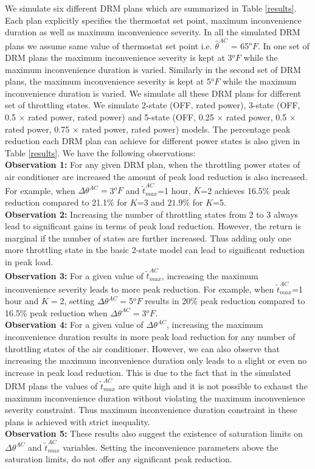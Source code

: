 \documentclass[10pt,twocolumn,twoside]{IEEEtran}
\begin{document}
We simulate six different DRM plans which are summarized in Table \ref{results}. Each plan explicitly specifies the thermostat set point, maximum inconvenience duration as well as maximum inconvenience severity. In all the simulated DRM plans we assume same value of thermostat set point i.e. $\hat{\theta}^{AC}$ = 65$^oF$. In one set of DRM plans the maximum inconvenience severity is kept at 3$^oF$ while the maximum inconvenience duration is varied. Similarly in the second set of DRM plans, the maximum inconvenience severity is kept at 5$^oF$ while the maximum inconvenience duration is varied. We simulate all these DRM plans for different set of throttling states. We simulate 2-state (OFF, rated power), 3-state (OFF, 0.5 $\times$ rated power, rated power) and 5-state (OFF, 0.25 $\times$ rated power, 0.5 $\times$ rated power, 0.75 $\times$ rated power, rated power) models. The percentage peak reduction each DRM plan can achieve for different power states is also given in Table \ref{results}. We have the following observations:\\
\textbf{Observation 1:} For any given DRM plan, when the throttling power states of air conditioner are increased the amount of peak load reduction is also increased. For example, when $\Delta{\theta}^{AC}=$3$^oF$ and $\tilde{t}^{AC}_{max}$=1 hour, $K$=2 achieves 16.5\% peak reduction compared to 21.1\% for $K$=3 and $21.9\%$ for $K$=5. \\
\textbf{Observation 2:} Increasing the number of throttling states from 2 to 3 always lead to significant gains in terms of peak load reduction. However, the return is marginal if the number of states are further increased. Thus adding only one more throttling state in the basic 2-state model can lead to significant reduction in peak load. \\
\textbf{Observation 3:} For a given value of $\tilde{t}^{AC}_{max}$, increasing the maximum inconvenience severity leads to more peak reduction. For example, when $\tilde{t}^{AC}_{max}$=1 hour and $K=2$, setting $\Delta{\theta}^{AC}=$5$^oF$ results in 20\% peak reduction compared to 16.5\% peak reduction when $\Delta{\theta}^{AC}=$3$^oF$. \\
\textbf{Observation 4:} For a given value of $\Delta{\theta}^{AC}$, increasing the maximum inconvenience duration results in more peak load reduction for any number of throttling states of the air conditioner. However, we can also observe that increasing the maximum inconvenience duration only leads to a slight or even no increase in peak load reduction. This is due to the fact that in the simulated DRM plans the values of $\tilde{t}^{AC}_{max}$ are quite high and it is not possible to exhaust the maximum inconvenience duration without violating the maximum inconvenience severity constraint. Thus maximum inconvenience duration constraint in these plans is achieved with strict inequality. \\
\textbf{Observation 5:} These results also suggest the existence of saturation limits on $\Delta{\theta}^{AC}$ and $\tilde{t}^{AC}_{max}$ variables. Setting the inconvenience parameters above the saturation limits, do not offer any significant peak reduction. 
\end{document}
